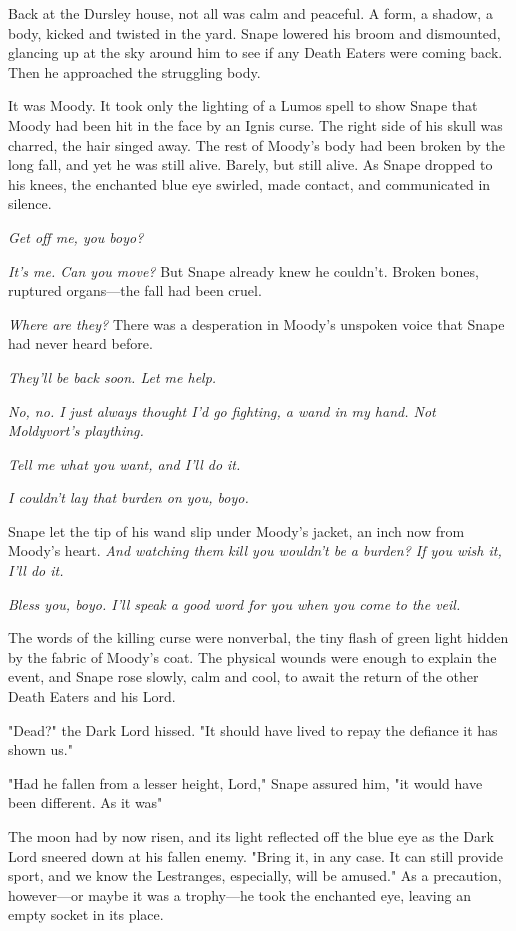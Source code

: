 Back at the Dursley house, not all was calm and peaceful. A form, a shadow, a body, kicked and twisted in the yard. Snape lowered his broom and dismounted, glancing up at the sky around him to see if any Death Eaters were coming back. Then he approached the struggling body.

It was Moody. It took only the lighting of a Lumos spell to show Snape that Moody had been hit in the face by an Ignis curse. The right side of his skull was charred, the hair singed away. The rest of Moody's body had been broken by the long fall, and yet he was still alive. Barely, but still alive. As Snape dropped to his knees, the enchanted blue eye swirled, made contact, and communicated in silence.

\emph{Get off me, you{\el} boyo?}

\emph{It's me. Can you move?} But Snape already knew he couldn't. Broken bones, ruptured organs—the fall had been cruel.

\emph{Where are they?} There was a desperation in Moody's unspoken voice that Snape had never heard before.

\emph{They'll be back soon. Let me help.}

\emph{No, no. I just always thought I'd go fighting, a wand in my hand. Not Moldyvort's plaything.}

\emph{Tell me what you want, and I'll do it.}

\emph{I couldn't lay that burden on you, boyo.}

Snape let the tip of his wand slip under Moody's jacket, an inch now from Moody's heart. \emph{And watching them kill you wouldn't be a burden? If you wish it, I'll do it.}

\emph{Bless you, boyo. I'll speak a good word for you when you come to the veil.}

The words of the killing curse were nonverbal, the tiny flash of green light hidden by the fabric of Moody's coat. The physical wounds were enough to explain the event, and Snape rose slowly, calm and cool, to await the return of the other Death Eaters and his Lord.

\sbreak

"Dead?" the Dark Lord hissed. "It should have lived to repay the defiance it has shown us."

"Had he fallen from a lesser height, Lord," Snape assured him, "it would have been different. As it was{\el}"

The moon had by now risen, and its light reflected off the blue eye as the Dark Lord sneered down at his fallen enemy. "Bring it, in any case. It can still provide sport, and we know the Lestranges, especially, will be amused." As a precaution, however—or maybe it was a trophy—he took the enchanted eye, leaving an empty socket in its place.

